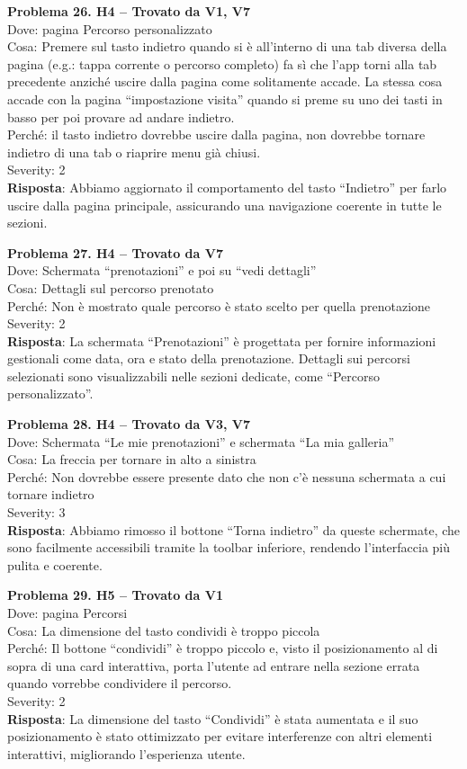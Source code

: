 \documentclass{article}
\begin{document}
\noindent \textbf{Problema 26. H4 – Trovato da V1, V7} \\
Dove: pagina Percorso personalizzato \\
Cosa: Premere sul tasto indietro quando si è all’interno di una tab diversa della pagina (e.g.: tappa corrente o percorso completo) fa sì che l’app torni alla tab precedente anziché uscire dalla pagina come solitamente accade. La stessa cosa accade con la pagina “impostazione visita” quando si preme su uno dei tasti in basso per poi provare ad andare indietro. \\
Perché: il tasto indietro dovrebbe uscire dalla pagina, non dovrebbe tornare indietro di una tab o riaprire menu già chiusi. \\
Severity: 2 \\
\textbf{Risposta}: Abbiamo aggiornato il comportamento del tasto “Indietro” per farlo uscire dalla pagina principale, assicurando una navigazione coerente in tutte le sezioni.

\noindent \textbf{Problema 27. H4 – Trovato da V7} \\
Dove: Schermata “prenotazioni” e poi su “vedi dettagli” \\
Cosa: Dettagli sul percorso prenotato \\
Perché: Non è mostrato quale percorso è stato scelto per quella prenotazione \\
Severity: 2 \\
\textbf{Risposta}: La schermata “Prenotazioni” è progettata per fornire informazioni gestionali come data, ora e stato della prenotazione. Dettagli sui percorsi selezionati sono visualizzabili nelle sezioni dedicate, come “Percorso personalizzato”.

\noindent \textbf{Problema 28. H4 – Trovato da V3, V7} \\
Dove: Schermata “Le mie prenotazioni” e schermata “La mia galleria” \\
Cosa: La freccia per tornare in alto a sinistra \\
Perché: Non dovrebbe essere presente dato che non c'è nessuna schermata a cui tornare indietro \\
Severity: 3 \\
\textbf{Risposta}: Abbiamo rimosso il bottone “Torna indietro” da queste schermate, che sono facilmente accessibili tramite la toolbar inferiore, rendendo l’interfaccia più pulita e coerente.

\noindent \textbf{Problema 29. H5 – Trovato da V1} \\
Dove: pagina Percorsi \\
Cosa: La dimensione del tasto condividi è troppo piccola \\
Perché: Il bottone “condividi” è troppo piccolo e, visto il posizionamento al di sopra di una card interattiva, porta l’utente ad entrare nella sezione errata quando vorrebbe condividere il percorso. \\
Severity: 2 \\
\textbf{Risposta}: La dimensione del tasto “Condividi” è stata aumentata e il suo posizionamento è stato ottimizzato per evitare interferenze con altri elementi interattivi, migliorando l’esperienza utente.
\end{document}
